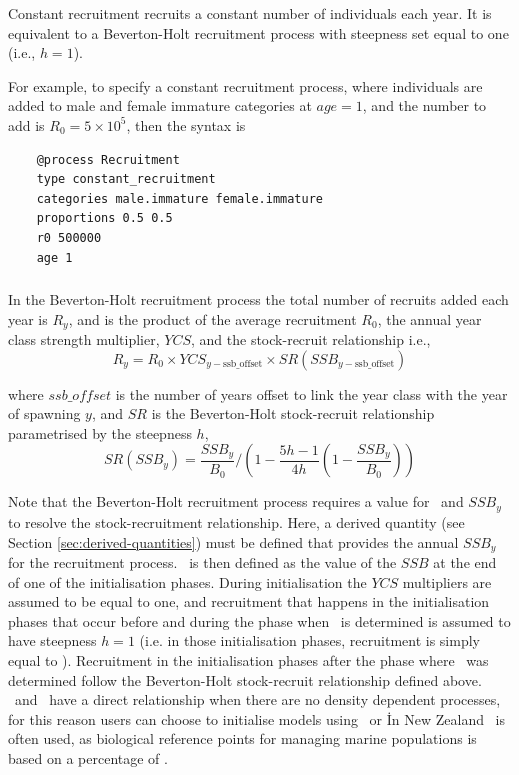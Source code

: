 Constant recruitment recruits a constant number of individuals each year. It is equivalent to a Beverton-Holt recruitment process with steepness set equal to one (i.e., $h=1$).

For example, to specify a constant recruitment process, where individuals are added to male and female immature categories at $age=1$, and the number to add is $R_0=5 \times 10^5$, then the syntax is

{\small{\begin{verbatim}
	@process Recruitment
	type constant_recruitment
	categories male.immature female.immature
	proportions 0.5 0.5
	r0 500000
	age 1
\end{verbatim}}}

\subsubsection*{}

In the Beverton-Holt recruitment process the total number of recruits added each year is $R_y$, and is the product of the average recruitment $R_0$, the annual year class strength multiplier, $YCS$, and the stock-recruit relationship i.e.,
\begin{equation}
  R_y = R_0 \times YCS_{y-\text{ssb\_offset}} \times SR(SSB_{y-\text{ssb\_offset}})
\end{equation}
  
where $ssb\_offset$ is the number of years offset to link the year class with the year of spawning $y$, and $SR$ is the Beverton-Holt stock-recruit relationship parametrised by the steepness $h$,
\begin{equation}
SR(SSB_y) = \frac{SSB_y}{B_0} / \left( 1-\frac{5h-1}{4h} \left( 1-\frac{SSB_y}{B_0} \right) \right)
\end{equation}

Note that the Beverton-Holt recruitment process requires a value for \Bzero\ and $SSB_y$ to resolve the stock-recruitment relationship. Here, a derived quantity (see Section \ref{sec:derived-quantities}) must be defined that provides the annual $SSB_y$ for the recruitment process. \Bzero\ is then defined as the value of the $SSB$ at the end of one of the initialisation phases. During initialisation the $YCS$ multipliers are assumed to be equal to one, and recruitment that happens in the initialisation phases that occur before and during the phase when \Bzero\ is determined is assumed to have steepness $h=1$ (i.e. in those initialisation phases, recruitment is simply equal to \Rzero). Recruitment in the initialisation phases after the phase where \Bzero\ was determined follow the Beverton-Holt stock-recruit relationship defined above. \Rzero\ and \Bzero\ have a direct relationship when there are no density dependent processes, for this reason users can choose to initialise models using \Bzero\ or \Rzero\. In New Zealand \Bzero\ is often used, as biological reference points for managing marine populations is based on a percentage of \Bzero.

